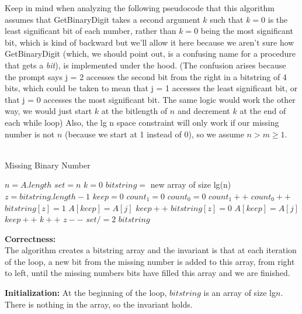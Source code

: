 \documentclass[11pt]{article}
\begin{document}
Keep in mind when analyzing the following pseudocode that this algorithm assumes that GetBinaryDigit takes a second argument $k$ such that $k = 0$ is the least significant bit of each number, rather than $k = 0$ being the most significant bit, which is kind of backward but we'll allow it here because we aren't sure how GetBinaryDigit (which, we should point out, is a confusing name for a procedure that gets a \textit{bit}), is implemented under the hood. (The confusion arises because the prompt says j = 2 accesses the second bit from the right in a bitstring of 4 bits, which could be taken to mean that j = 1 accesses the least significant bit, or that j = 0 accesses the most significant bit. The same logic would work the other way, we would just start $k$ at the bitlength of $n$ and decrement $k$ at the end of each while loop) Also, the lg n space constraint will only work if our missing number is not $n$ (because we start at 1 instead of 0), so we assume $n > m \geq 1$.\\\\

\begin{algorithm}
\caption{Missing Binary Number}\label{euclid}
\begin{algorithmic}[1]
\State $n = A.length$
\State $set = n$
\State $k = 0$
\State $bitstring = $ new array of size lg(n)
\State $z = bitstring.length -1$
\State $keep = 0$
\State $count_1 = 0$
\State $count_0 = 0$ 
\State $count_1 ++$
\State $count_0 ++$
\EndIf
\EndFor
{}
\State $bitstring[z] = 1$
\State $A[keep] = A[j]$
\State $keep++$
\EndIf
\EndFor
\Else
\State $bitstring[z] = 0$
\State $A[keep] = A[j]$
\State $keep++$
\EndIf
\EndFor
\EndIf
\State $k++$
\State $z--$
\State $set /=2$
\EndWhile
\Return $bitstring$
\EndProcedure
\end{algorithmic}
\end{algorithm}
\noindent\textbf{Correctness:}\\
The algorithm creates a bitstring array and the invariant is that at each iteration of the loop, a new bit from the missing number is added to this array, from right to left, until the missing numbers bits have filled this array and we are finished. 

\textbf{Initialization:} At the beginning of the loop, $bitstring$ is an array of size lg$n$. There is nothing in the array, so the invariant holds. 
\end{document}
